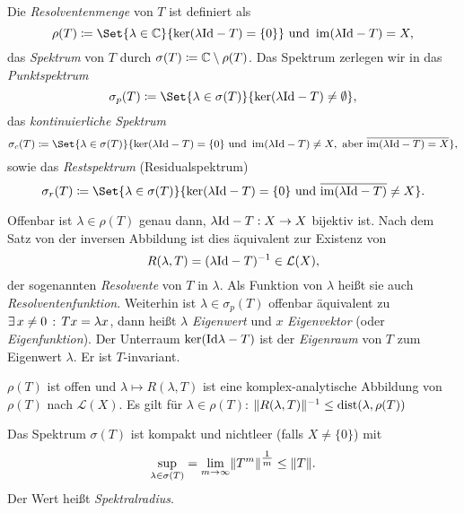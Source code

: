 \documentclass{cheat-sheet}
\newcommand{\dist}{\mathrm{dist}} %
\begin{document}


\begin{defn}
  Die \emph{Resolventenmenge} von $T$ ist definiert als
  \[ \rho(T) \coloneqq \Set{ \lambda \in \C }{ \ker (\lambda \Id - T) = \{ 0 \} } \text{ und } \im (\lambda \Id - T) = X, \]
  das \emph{Spektrum} von $T$ durch $\sigma(T) \coloneqq \mathbb{C} \setminus \rho(T)$. Das Spektrum zerlegen wir in das \emph{Punktspektrum}
  \[ \sigma_p(T) \coloneqq \Set{ \lambda \in \sigma(T) }{ \ker(\lambda \Id - T) \not= \emptyset }, \]
  das \emph{kontinuierliche Spektrum}
  \[ \sigma_c(T) \coloneqq \Set{ \lambda \in \sigma(T) }{ \ker(\lambda \Id - T) = \{ 0 \} \text{ und } \im (\lambda \Id - T) \not= X, \text{ aber } \overline{\im (\lambda \Id - T) = X } }, \]
  sowie das \emph{Restspektrum} (Residualspektrum)
  \[ \sigma_r(T) \coloneqq \Set{ \lambda \in \sigma(T) }{ \ker(\lambda \Id - T) = \{ 0 \} \text{ und } \overline{\im(\lambda \Id - T)} \not= X }. \]
\end{defn}

Offenbar ist $\lambda \in \rho(T)$ genau dann, $\lambda \mathrm{Id} - T : X \to X$ bijektiv ist. Nach dem Satz von der inversen Abbildung ist dies äquivalent zur Existenz von
\[ R(\lambda, T) = (\lambda \mathrm{Id} - T)^{-1} \in \mathcal{L}(X), \]
der sogenannten \emph{Resolvente} von $T$ in $\lambda$. Als Funktion von $\lambda$ heißt sie auch \emph{Resolventenfunktion}. Weiterhin ist $\lambda \in \sigma_p(T)$ offenbar äquivalent zu $\exists \, {x \not= 0} \,:\, Tx = \lambda x$, dann heißt $\lambda$ \emph{Eigenwert} und $x$ \emph{Eigenvektor} (oder \emph{Eigenfunktion}). Der Unterraum $\ker(\mathrm{Id} \lambda - T)$ ist der \emph{Eigenraum} von $T$ zum Eigenwert $\lambda$. Er ist $T$-invariant.


\begin{satz}
  $\rho(T)$ ist offen und $\lambda \mapsto R(\lambda, T)$ ist eine komplex-analytische Abbildung von $\rho(T)$ nach $\mathcal{L}(X)$. Es gilt für $\lambda \in \rho(T)$: $\norm{R(\lambda, T)}^{-1} \leq \dist(\lambda, \rho(T))$
\end{satz}

\begin{satz}
  Das Spektrum $\sigma(T)$ ist kompakt und nichtleer (falls $X \not= \{ 0 \}$) mit
  \[ \sup_{\lambda \in \sigma(T)} = \lim_{m \to \infty} \lVert T^m\rVert^{\tfrac{1}{m}} \leq \lVert T\rVert. \]
  Der Wert heißt \emph{Spektralradius}.
\end{satz}
\end{document}
